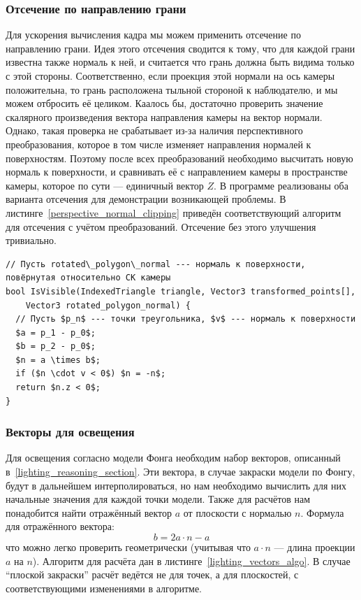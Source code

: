 \documentclass[a4paper,12pt]{report}
\numberwithin{equation}{section}
\begin{document}
\subsubsection{Отсечение по направлению грани} \label{normal_clipping_section}
Для ускорения вычисления кадра мы можем применить отсечение по направлению грани. Идея этого отсечения сводится к тому, что для каждой грани известна также нормаль к ней, и считается что грань должна быть видима только с этой стороны. Соответственно, если проекция этой нормали на ось камеры положительна, то грань расположена тыльной стороной к наблюдателю, и мы можем отбросить её целиком. Каалось бы, достаточно проверить значение скалярного произведения вектора направления камеры на вектор нормали. Однако, такая проверка не срабатывает из-за наличия перспективного преобразования, которое в том числе изменяет направления нормалей к поверхностям. Поэтому после всех преобразований необходимо высчитать новую нормаль к поверхности, и сравнивать её с направлением камеры в пространстве камеры, которое по сути --- единичный вектор $Z$. В программе реализованы оба варианта отсечения для демонстрации возникающей проблемы. В листинге~\ref{perspective_normal_clipping} приведён соответствующий алгоритм для отсечения с учётом преобразований. Отсечение без этого улучшения тривиально.

\begin{lstlisting}[float=p,caption={Отсечение по направлению грани с учётом преобразований},label=perspective_normal_clipping]
// Пусть rotated\_polygon\_normal --- нормаль к поверхности, повёрнутая относительно СК камеры
bool IsVisible(IndexedTriangle triangle, Vector3 transformed_points[],
    Vector3 rotated_polygon_normal) {
  // Пусть $p_n$ --- точки треугольника, $v$ --- нормаль к поверхности
  $a = p_1 - p_0$;
  $b = p_2 - p_0$;
  $n = a \times b$;
  if ($n \cdot v < 0$) $n = -n$;
  return $n.z < 0$;
}
\end{lstlisting}

\subsubsection{Векторы для освещения}
Для освещения согласно модели Фонга необходим набор векторов, описанный в~\ref{lighting_reasoning_section}. Эти вектора, в случае закраски модели по Фонгу, будут в дальнейшем интерполироваться, но нам необходимо вычислить для них начальные значения для каждой точки модели. Также для расчётов нам понадобится найти отражённый вектор $a$ от плоскости с нормалью $n$. Формула для отражённого вектора:
\begin{equation}
b = 2 a \cdot n - a
\end{equation}
что можно легко проверить геометрически (учитывая что $a \cdot n$ --- длина проекции $a$ на $n$). Алгоритм для расчёта дан в листинге~\ref{lighting_vectors_algo}. В случае ``плоской закраски'' расчёт ведётся не для точек, а для плоскостей, с соответствующими изменениями в алгоритме.
\end{document}
